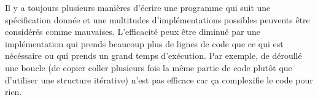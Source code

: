 Il y a toujours plusieurs manières d'écrire une programme qui suit une spécification donnée et une multitudes d'implémentations possibles peuvents être considérés comme mauvaises. L'efficacité peux être diminué par une implémentation qui prends beaucoup plus de lignes de code que ce qui est nécéssaire ou qui prends un grand temps d'exécution. Par exemple, de déroullé une boucle (de copier coller plusieurs fois la même partie de code plutôt que d'utiliser une structure itérative) n'est pas efficace car ça complexifie le code pour rien.